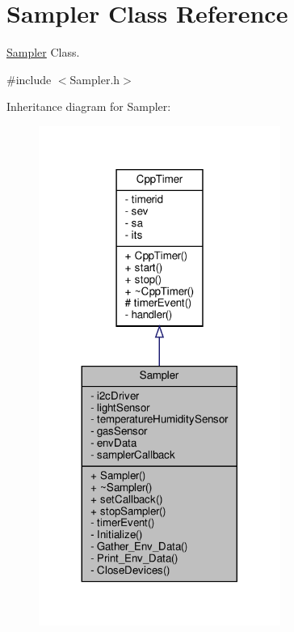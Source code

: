 \hypertarget{classSampler}{}\section{Sampler Class Reference}
\label{classSampler}


\hyperlink{classSampler}{Sampler} Class.  




{\ttfamily \#include $<$Sampler.\+h$>$}



Inheritance diagram for Sampler\+:\nopagebreak
\begin{figure}[H]
\begin{center}
\leavevmode
\includegraphics[width=224pt]{classSampler__inherit__graph}
\end{center}
\end{figure}


